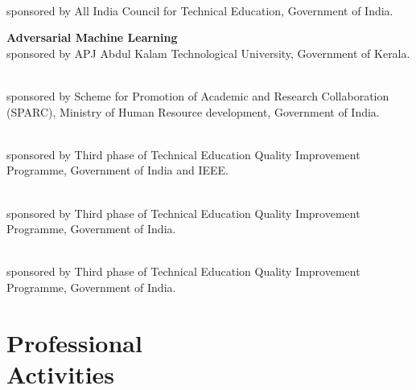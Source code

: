 \documentclass[mm]{simple_style}
\begin{document}
\begin{resume}
  \\
sponsored by All India Council for Technical Education, Government of India. 

\textbf{Adversarial Machine Learning}   \\
sponsored by APJ Abdul Kalam Technological University, Government of Kerala.

  \\
sponsored by Scheme for Promotion of Academic and Research Collaboration (SPARC), Ministry of Human Resource development, Government of India. 

  \\ 
sponsored by Third phase of Technical Education Quality Improvement Programme, Government of India and IEEE.

  \\
sponsored by Third phase of Technical Education Quality Improvement Programme, Government of India. 

  \\
sponsored by Third phase of Technical Education Quality Improvement Programme, Government of India.

\vspace{-2ex}
\sectionline

\section{Professional \\Activities}



\end{resume}
\end{document}
